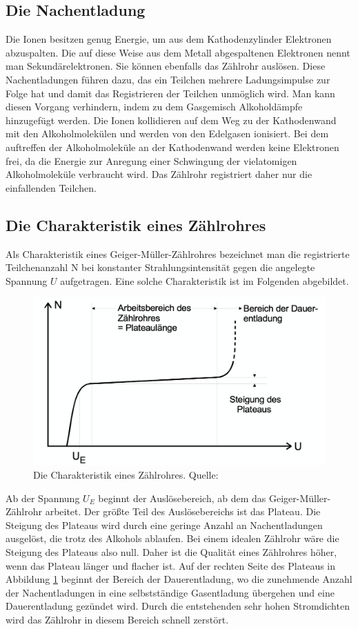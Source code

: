   \subsection{Die Nachentladung}
    Die Ionen besitzen genug Energie, um aus dem Kathodenzylinder Elektronen abzuspalten. Die auf
    diese Weise aus dem Metall abgespaltenen Elektronen nennt man Sekundärelektronen. Sie können
    ebenfalls das Zählrohr auslösen. Diese Nachentladungen führen dazu, das ein Teilchen mehrere
    Ladungsimpulse zur Folge hat und damit das Registrieren der Teilchen unmöglich wird. Man kann
    diesen Vorgang verhindern, indem zu dem Gasgemisch Alkoholdämpfe hinzugefügt werden. Die Ionen
    kollidieren auf dem Weg zu der Kathodenwand mit den Alkoholmolekülen und werden von den Edelgasen
    ionisiert. Bei dem auftreffen der Alkoholmoleküle an der Kathodenwand werden keine Elektronen
    frei, da die Energie zur Anregung einer Schwingung der vielatomigen Alkoholmoleküle verbraucht
    wird. Das Zählrohr registriert daher nur die einfallenden Teilchen.
  \subsection{Die Charakteristik eines Zählrohres}
    Als Charakteristik eines Geiger-Müller-Zählrohres bezeichnet man die registrierte Teilchenanzahl N
    bei konstanter Strahlungsintensität gegen die angelegte Spannung $U$ aufgetragen. Eine solche
    Charakteristik ist im Folgenden abgebildet.
    \begin{figure}[H]
      \centering
      \includegraphics[scale=0.6]{content/Charakteristik.png}
      \caption{Die Charakteristik eines Zählrohres. Quelle:\cite{AP01}}
      \label{fig:charakteristik1}
    \end{figure}
    \noindent
    Ab der Spannung $U_{E}$ beginnt der Auslösebereich, ab dem das Geiger-Müller-Zählrohr arbeitet.
    Der größte Teil des Auslösebereichs ist das Plateau. Die Steigung des Plateaus wird durch eine
    geringe Anzahl an Nachentladungen ausgelöst, die trotz des Alkohols ablaufen. Bei einem idealen
    Zählrohr wäre die Steigung des Plateaus also null. Daher ist die Qualität eines Zählrohres höher,
    wenn das Plateau länger und flacher ist. Auf der rechten Seite des Plateaus in Abbildung
    \ref{fig:charakteristik1} beginnt der Bereich der Dauerentladung, wo die zunehmende Anzahl der
    Nachentladungen in eine selbstständige Gasentladung übergehen und eine Dauerentladung gezündet
    wird. Durch die entstehenden sehr hohen Stromdichten wird das Zählrohr in diesem Bereich schnell
    zerstört.
\label{sec:Theorie}
